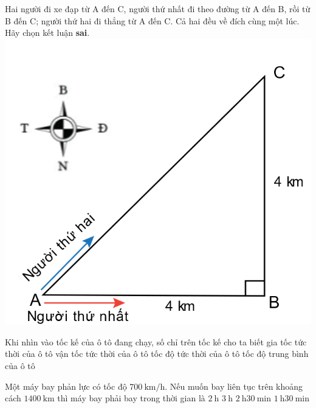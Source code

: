 \begin{ex}
	
	Hai người đi xe đạp từ A đến C, người thứ nhất đi theo đường từ A đến B, rồi từ B đến C; người thứ hai đi thẳng từ A đến C. Cả hai đều về đích cùng một lúc.\\
	Hãy chọn kết luận \textbf{sai}.	
	{
		\includegraphics[width=0.5\linewidth]{figs/VN10-2022-PH-TP004-P-3}
	}
	\loigiai{}
	
\end{ex}
\begin{ex}
	Khi nhìn vào tốc kế của ô tô đang chạy, số chỉ trên tốc kế cho ta biết
	\choice
	{gia tốc tức thời của ô tô}
	{vận tốc tức thời của ô tô}
	{\True tốc độ tức thời của ô tô}
	{tốc độ trung bình của ô tô}
	\loigiai{}
\end{ex}
\begin{ex}
	Một máy bay phản lực có tốc độ $\SI{700}{\kilo\meter/\hour}$. Nếu muốn bay liên tục trên khoảng cách $\SI{1400}{\kilo\meter}$ thì máy bay phải bay trong thời gian là
	\choice
	{\True $\SI{2}{\hour}$}
	{$\SI{3}{\hour}$}
	{$\SI{2}{\hour}\SI{30}{\minute}$}
	{$\SI{1}{\hour}\SI{30}{\minute}$}
\end{ex}

